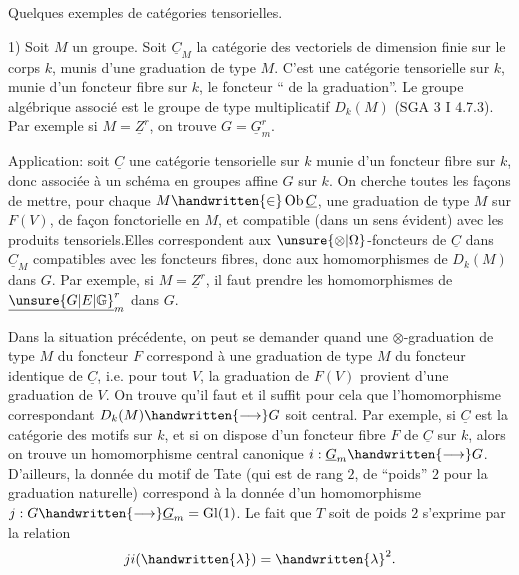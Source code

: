 
Quelques exemples de catégories tensorielles.

1) Soit $M$ un groupe. Soit $\underline{C}_M$ la catégorie des vectoriels de dimension finie sur le corps $k$, munis d'une graduation de type $M$. C'est une catégorie tensorielle sur $k$, munie d'un foncteur fibre sur $k$, le foncteur `` de la graduation''. Le groupe algébrique associé est le groupe de type multiplicatif $D_k(M)$ (SGA 3 I 4.7.3). Par exemple si $M=\underline{Z}^r$, on trouve $G=\underline{G}_m^r$.

Application: soit $\underline{C}$ une catégorie tensorielle sur $k$ munie d'un foncteur fibre  sur $k$, donc associée à un schéma en groupes affine $G$ sur $k$. On cherche toutes les façons de mettre, pour chaque $M\handwritten{\in}\operatorname{Ob}\underline{C}$, une graduation de type $M$ sur $F(V)$, de façon fonctorielle en $M$, et compatible (dans un sens évident) avec les produits tensoriels.Elles correspondent aux $\unsure{\otimes|\Omega}$-foncteurs de $\underline{C}$ dans $\underline{C}_M$ compatibles avec les foncteurs fibres, donc aux homomorphismes de $D_k(M)$ dans $G$. Par exemple, si $M=\underline{Z}^r$, il faut prendre les homomorphismes de $\underline{\unsure{G|E|\mathbb{G}}}_m^r$ dans $G$.

Dans la situation précédente, on peut se demander quand une $\otimes$-graduation de type $M$ du foncteur $F$ correspond à une graduation de type $M$ du foncteur identique de $\underline{C}$, i.e. pour tout $V$, la graduation de $F(V)$ provient d'une graduation de $V$. On trouve qu'il faut et il suffit pour cela que l'homomorphisme correspondant $D_k(M)\handwritten{\longrightarrow}G$ soit central. Par exemple, si $\underline{C}$ est la catégorie des motifs sur $k$, et si on dispose d'un foncteur fibre $F$ de $\underline{C}$ sur $k$, alors on trouve un homomorphisme central canonique $i:\underline{G}_m\handwritten{\longrightarrow}G$. D'ailleurs, la donnée du motif de Tate (qui est de rang $2$,  de ``poids'' $2$ pour la graduation naturelle) correspond à  la donnée d'un homomorphisme $j:G\handwritten{\longrightarrow}\underline{G}_m=\operatorname{Gl}(1)$. Le fait que $T$ soit de poids $2$ s'exprime par la relation
\[
ji(\handwritten{\lambda})=\handwritten{\lambda}^{2}.
\]

